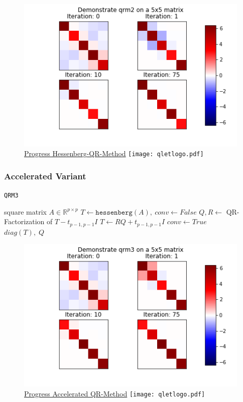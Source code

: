 \documentclass[12pt]{article}
\begin{document}
\begin{figure}
\begin{center}
\caption{\href {https://github.com/thsis/NIS18/tree/master/media/plots}{Progress Hessenberg-QR-Method}  \protect\texttt{[image: qletlogo.pdf]}}
  \includegraphics[scale=0.6]{../media/plots/qrm2.png}
\end{center}
\end{figure}


\subsubsection{Accelerated Variant}

\begin{algorithm}
\begin{algorithmic}[1]
\caption{\texttt{QRM3}}
\Require square matrix $A \in \mathbb{R}^{p \times p}$
\State $T \gets \texttt{hessenberg}(A),\ conv \gets False$
    \State $Q, R \gets$ QR-Factorization of $T - t_{p-1, p-1} I$
    \State $T \gets RQ + t_{p-1, p-1}I$
        \State $conv \gets True$
    \EndIf
\EndWhile\\
\Return $diag\left(T\right),\; Q$
\end{algorithmic}
\end{algorithm}

\begin{figure}
\begin{center}
\caption{\href {https://github.com/thsis/NIS18/tree/master/media/plots}{Progress Accelerated QR-Method}  \protect\texttt{[image: qletlogo.pdf]}}
  \includegraphics[scale=0.6]{../media/plots/qrm3.png}
\end{center}
\end{figure}
\end{document}
